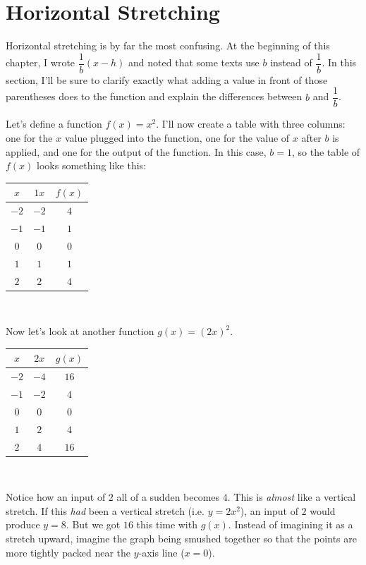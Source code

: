 \clearpage \section{Horizontal Stretching}
Horizontal stretching is by far the most confusing. At the beginning of this chapter, I wrote $\dfrac{1}{b}(x - h)$ and noted that some texts use $b$ instead of $\dfrac{1}{b}$. In this section, I'll be sure to clarify exactly what adding a value in front of those parentheses does to the function and explain the differences between $b$ and $\dfrac{1}{b}$. 

Let's define a function $f(x) = x^2$. I'll now create a table with three columns: one for the $x$ value plugged into the function, one for the value of $x$ after $b$ is applied, and one for the output of the function. In this case, $b = 1$, so the table of $f(x)$ looks something like this:
\begin{center}
    \begin{tabular}{ c | c | c }
        $x$ & $1x$ & $f(x)$ \\
        \hline
        $-2$ & $-2$ & $4$ \\
        \hline
        $-1$ & $-1$ & $1$ \\
        \hline
        $0$ & $0$ & $0$ \\
        \hline
        $1$ & $1$ & $1$ \\
        \hline
        $2$ & $2$ & $4$
    \end{tabular}\\
\end{center}
Now let's look at another function $g(x) = (2x)^2$.
\begin{center}
    \begin{tabular}{ c | c | c }
        $x$ & $2x$ & $g(x)$ \\
        \hline
        $-2$ & $-4$ & $16$ \\
        \hline
        $-1$ & $-2$ & $4$ \\
        \hline
        $0$ & $0$ & $0$ \\
        \hline
        $1$ & $2$ & $4$ \\
        \hline
        $2$ & $4$ & $16$
    \end{tabular}\\
\end{center}
Notice how an input of $2$ all of a sudden becomes $4$. This is \textit{almost} like a vertical stretch. If this \textit{had} been a vertical stretch (i.e. $y = 2x^2$), an input of $2$ would produce $y = 8$. But we got $16$ this time with $g(x)$. Instead of imagining it as a stretch upward, imagine the graph being smushed together so that the points are more tightly packed near the $y$-axis line ($x = 0$).

